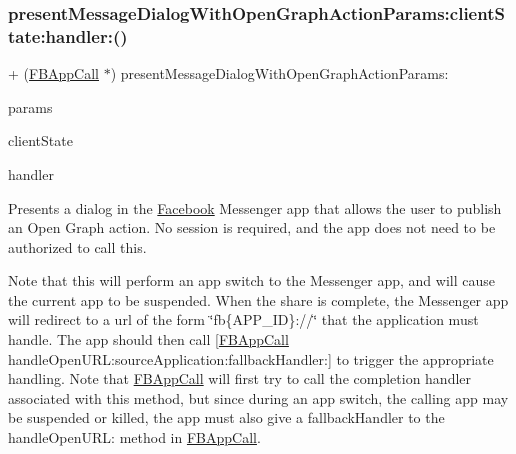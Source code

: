 \subsubsection{\texorpdfstring{present\+Message\+Dialog\+With\+Open\+Graph\+Action\+Params\+:client\+State\+:handler\+:()}{presentMessageDialogWithOpenGraphActionParams:clientState:handler:()}\hspace{0.1cm}{\footnotesize\ttfamily [4/5]}}
{\footnotesize\ttfamily + (\hyperlink{interfaceFBAppCall}{F\+B\+App\+Call} $\ast$) present\+Message\+Dialog\+With\+Open\+Graph\+Action\+Params\+: \begin{DoxyParamCaption}\item[{(\hyperlink{interfaceFBOpenGraphActionParams}{F\+B\+Open\+Graph\+Action\+Params} $\ast$)}]{params }\item[{clientState:(N\+S\+Dictionary $\ast$)}]{client\+State }\item[{handler:(F\+B\+Dialog\+App\+Call\+Completion\+Handler)}]{handler }\end{DoxyParamCaption}}

Presents a dialog in the \hyperlink{interfaceFacebook}{Facebook} Messenger app that allows the user to publish an Open Graph action. No session is required, and the app does not need to be authorized to call this.

Note that this will perform an app switch to the Messenger app, and will cause the current app to be suspended. When the share is complete, the Messenger app will redirect to a url of the form \char`\"{}fb\{\+A\+P\+P\+\_\+\+I\+D\}\+://\char`\"{} that the application must handle. The app should then call \mbox{[}\hyperlink{interfaceFBAppCall}{F\+B\+App\+Call} handle\+Open\+U\+R\+L\+:source\+Application\+:fallback\+Handler\+:\mbox{]} to trigger the appropriate handling. Note that \hyperlink{interfaceFBAppCall}{F\+B\+App\+Call} will first try to call the completion handler associated with this method, but since during an app switch, the calling app may be suspended or killed, the app must also give a fallback\+Handler to the handle\+Open\+U\+RL\+: method in \hyperlink{interfaceFBAppCall}{F\+B\+App\+Call}.



